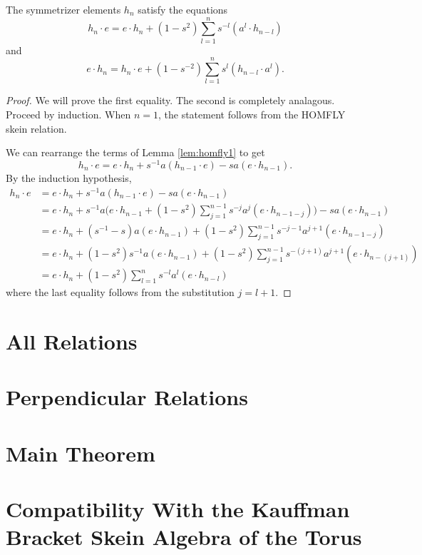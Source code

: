 \begin{theorem} \label{prop:homfly2}
The symmetrizer elements $h_n$ satisfy the equations
\[
h_n \cdot e = e \cdot h_n + ( 1 - s^2 ) \sum_{l=1}^{n} s^{-l} ( a^l \cdot h_{n-l} )
\]
and
\[
e \cdot h_n = h_n \cdot e + (1 - s^{-2} ) \sum_{l=1}^{n} s^l ( h_{n-l} \cdot a^l ).
\]
\end{theorem}
\begin{proof}
We will prove the first equality. The second is completely analagous. Proceed by induction. When $n=1$, the statement follows from the HOMFLY skein relation. 

We can rearrange the terms of Lemma \ref{lem:homfly1} to get
\begin{equation} \label{eq:homfly1b}
h_n \cdot e = e \cdot h_n + s^{-1} a ( h_{n-1} \cdot e ) - s a ( e \cdot h_{n-1} ).
\end{equation}
By the induction hypothesis,
\begin{align*}
h_n \cdot e & = e \cdot h_n + s^{-1} a ( h_{n-1} \cdot e ) - s a ( e \cdot h_{n-1} ) \\
& = e \cdot h_n + s^{-1} a \Big( e \cdot h_{n-1} + ( 1 - s^2 ) \sum_{j=1}^{n-1} s^{-j} a^j ( e \cdot h_{n-1-j} ) \Big) - s a ( e \cdot h_{n-1} ) \\
& = e \cdot h_n + ( s^{-1} - s ) a ( e \cdot h_{n-1} ) + ( 1 - s^2 ) \sum_{j=1}^{n-1} s^{-j-1} a^{j+1} ( e \cdot h_{n-1-j} ) \\ 
& = e \cdot h_n + ( 1 - s^2 ) s^{-1} a ( e \cdot h_{n-1} ) + ( 1 - s^2 ) \sum_{j=1}^{n-1} s^{-(j+1)} a^{j+1} ( e \cdot h_{n-(j+1)} ) \\
&= e \cdot h_n + ( 1 - s^2 ) \sum_{l=1}^{n} s^{-l} a^{l} ( e \cdot h_{n-l} )
\end{align*}
where the last equality follows from the substitution $j=l+1$. 
\end{proof}

\section{All Relations}




\section{Perpendicular Relations}




\section{Main Theorem}




\section{Compatibility With the Kauffman Bracket Skein Algebra of the Torus}
